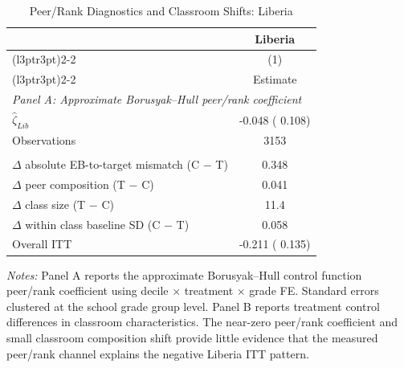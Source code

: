\begin{table}[H]
\centering
\caption{Peer/Rank Diagnostics and Classroom Shifts: Liberia}
\label{tab:suffstat_liberia}
\begin{threeparttable}
\begin{tabular}[t]{lc}
\toprule
\multicolumn{1}{c}{ } & \multicolumn{1}{c}{Liberia} \\
\cmidrule(l{3pt}r{3pt}){2-2}
\multicolumn{1}{c}{ } & \multicolumn{1}{c}{(1)} \\
\cmidrule(l{3pt}r{3pt}){2-2}
 & Estimate \\
\midrule
\multicolumn{2}{l}{\textit{Panel A: Approximate Borusyak--Hull peer/rank coefficient}} \\
$\hat{\zeta}_{Lib}$ &  -0.048 (  0.108) \\
Observations & 3153 \\
\addlinespace
\multicolumn{2}{l}{\textit{Panel B: Treatment-induced classroom shifts}} \\
$\Delta$ absolute EB-to-target mismatch (C $-$ T) &   0.348 \\
$\Delta$ peer composition (T $-$ C) &   0.041 \\
$\Delta$ class size (T $-$ C) &    11.4 \\
$\Delta$ within class baseline SD (C $-$ T) &   0.058 \\
\addlinespace
Overall ITT &  -0.211 (  0.135) \\
\bottomrule
\end{tabular}
\begin{tablenotes}
\footnotesize
\item \textit{Notes:} Panel A reports the approximate Borusyak--Hull control function peer/rank coefficient using decile $\times$ treatment $\times$ grade FE\@. Standard errors clustered at the school grade group level. Panel B reports treatment control differences in classroom characteristics. The near-zero peer/rank coefficient and small classroom composition shift provide little evidence that the measured peer/rank channel explains the negative Liberia ITT pattern.
\end{tablenotes}
\end{threeparttable}
\end{table}
